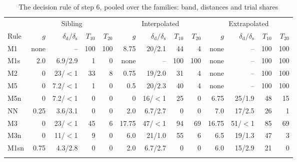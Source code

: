 \documentclass[pdflatex,sn-basic]{sn-jnl}
\newcommand{\tabsizesmall}{\footnotesize}
\begin{document}
\begin{table}[p]
\tabsizesmall
\setlength{\tabcolsep}{2.2pt}
\caption{The decision rule of step 6, pooled over the families: band, distances and trial shares}\label{tab:s-step6}
\begin{tabular*}{\textwidth}{@{\extracolsep{\fill}}lrrrrrrrrrrrr@{}}
\toprule
 & \multicolumn{4}{c}{Sibling} & \multicolumn{4}{c}{Interpolated} & \multicolumn{4}{c}{Extrapolated} \\
\cmidrule(lr){2-5}\cmidrule(lr){6-9}\cmidrule(lr){10-13}
Rule & $g$ & $\delta_\mathrm{d}/\delta_\mathrm{s}$ & $T_{10}$ & $T_{20}$ & $g$ & $\delta_\mathrm{d}/\delta_\mathrm{s}$ & $T_{10}$ & $T_{20}$ & $g$ & $\delta_\mathrm{d}/\delta_\mathrm{s}$ & $T_{10}$ & $T_{20}$ \\
\midrule
M1 & none & -- & 100 & 100 & 8.75 & 20/2.1 & 44 & 4 & none & -- & 100 & 100 \\
M1s & 2.0 & 6.9/2.9 & 1 & 0 & none & -- & 100 & 100 & none & -- & 100 & 100 \\
M2 & 0 & 23/$<$1 & 33 & 8 & 0.75 & 19/2.0 & 31 & 4 & none & -- & 100 & 100 \\
M5 & 0 & 7.2/$<$1 & 1 & 0 & 0.5 & 20/2.3 & 40 & 4 & none & -- & 100 & 100 \\
M5n & 0 & 7.2/$<$1 & 0 & 0 & 0 & 16/$<$1 & 25 & 0 & 6.75 & 25/1.9 & 48 & 15 \\
NN & 0.25 & 3.6/3.1 & 0 & 0 & 2.0 & 6.7/2.7 & 0 & 0 & 7.0 & 17/2.5 & 26 & 1 \\
M3 & 0 & 23/$<$1 & 45 & 6 & 17.75 & 47/$<$1 & 94 & 69 & 16.75 & 51/$<$1 & 85 & 69 \\
M3n & 0 & 11/$<$1 & 9 & 0 & 6.0 & 21/1.0 & 55 & 6 & 6.5 & 19/1.3 & 47 & 3 \\
M1sn & 0.75 & 4.3/2.8 & 0 & 0 & 2.0 & 6.7/2.7 & 0 & 0 & 6.0 & 15/2.9 & 21 & 0 \\
\botrule
\end{tabular*}
\end{table}
\end{document}
